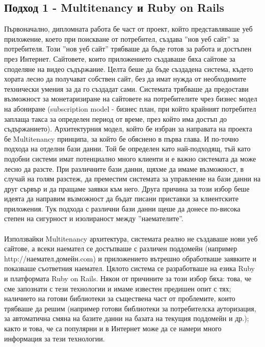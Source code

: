 \documentclass[pdftex,14pt,a4paper]{extreport}
\begin{document}
\subsection {Подход 1 - Multitenancy и Ruby on Rails}
Първоначално, дипломната работа бе част от проект, който представляваше уеб приложение, което при поискване от потребител, създава ''нов уеб сайт'' за потребителя. Този ''нов уеб сайт'' трябваше да бъде готов за работа и достъпен през Интернет. Сайтовете, които приложението създаваше бяха сайтове за споделяне на видео съдържание. Целта беше да бъде създадена система, където хората лесно да получават собствен сайт, без да имат нужда от необходимите технически умения за да го създадат сами. Системата трябваше да предостави възможност за монетаризиране на сайтовете на потребителите чрез бизнес модел на абониране (subscription model - бизнес план, при който крайният потребител заплаща такса за определен период от време, през който има достъп до съдържанието). Архитектурния модел, който бе избран за направата на проекта бе Multitenancy принципа, за който бе обяснено в първа глава. И по-точно подхода на отделни бази данни. Той бе определен като най-подходящ, тъй като подобни системи имат потенциално много клиенти и е важно системата да може лесно да разсте. При различните бази данни, щяхме да имаме възможност, в случай на голям разстеж, да преместим системата за управление на бази данни на друг сървър и да пращаме заявки към него. Друга причина за този избор беше идеята да направим възможност да бъдат писани приставки за клиентските приложения. Тук подхода с различни бази данни щеше да донесе по-висока степен на сигурност и изолираност между ''наемателите''. \\\\
Използвайки Multitenancy архитектура, системата реално не създаваше нови уеб сайтове, а всеки наемател се достъпваше с различен поддомейн (например http://наемател.домейн.com) и приложението вътрешно обработваше заявките и показваше съответния наемател. Цялото система се разработваше на езика Ruby и платформата Ruby on Rails. Някои от причините за този избор бяха: това, че сме запознати с тези технологии и имаме известен предишен опит с тях; наличието на готови библиотеки за съществена част от проблемите, които трябваше да решим (например готови библиотеки за потребителска ауторизация, за автоматична смяна на базите данни на базата на текущия поддомейн и др.); както и това, че са популярни и в Интернет може да се намери много информация за тези технологии.\\\\
\end{document}
